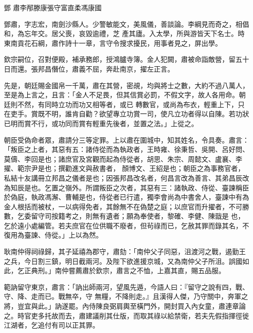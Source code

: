 
\begin{pinyinscope}

 鄧
 肅李邴滕康張守富直柔馮康國



 鄧肅，字志宏，南劍沙縣人。少警敏能文，美風儀，善談論。李綱見而奇之，相倡和，為忘年交。居父喪，哀毀逾禮，芝
 產其廬。入太學，所與游皆天下名士。時東南貢花石綱，肅作詩十一章，言守令搜求擾民，用事者見之，屏出學。



 欽宗嗣位，召對便殿，補承務郎，授鴻臚寺簿。金人犯闕，肅被命詣敵營，留五十日而還。張邦昌僭位，肅義不屈，奔赴南京，擢左正言。



 先是，朝廷賜金國帛一千萬，肅在其營，密覘，均與將士之數，大約不過八萬人，至是為上言之，且言：「金人不足畏，但其信賞必罰，不假文字，故人各用命。朝廷則不然，有同時立功而功又相等者，或已
 轉數官，或尚為布衣，輕重上下，只在吏手。賞既不明，誰肯自勸？欲望專立功賞一司，使凡立功者得以自陳。若功狀已明而賞不行，或功同而賞有輕重先後者，並置之法。」上從之。



 朝臣受偽命者眾，肅請分三等定罪。上以肅在圍城中，知其姓名，令具奏。肅言：「叛臣之上者，其惡有五：諸侍從而為執政者，王時雍、徐秉哲、吳開、呂好問、莫儔、李回是也；諸庶官及宮觀而起為侍從者，胡思、朱宗、周懿文、盧襄、李擢、範宗尹是也；撰勸進文與赦書者，
 顏博文、王紹是也；朝臣之為事務官者，私結十友講冊立邦昌之儀者是也；因張邦昌改名者，何昌言改為善言、其弟昌辰改為知辰是也。乞置之嶺外。所謂叛臣之次者，其惡有三：諸執政、侍從、臺諫稱臣於偽庭，執政馮澥、曹輔是也，侍從者已行遣，獨李會尚為中書舍人，臺諫中有為金人根括而被杖，一以病得免者，其餘無不在偽楚之庭；以庶官而升擢者，不可勝數，乞委留守司按籍考之，則無有遺者；願為奉使者，黎確、李健、陳戩是
 也，乞於遠小處編管。若夫庶官在位供職不廢者，但茍祿而已，乞赦其罪而錄其名，不復用為臺諫、侍從。」上以為然。



 耿南仲得祠祿歸，其子延禧為郡守，肅劾：「南仲父子同惡，沮渡河之戰，遏勤王之兵，今日割三鎮，明日截兩河。及陛下欲進援京城，又為南仲父子所沮。誤國如此，乞正典刑。」南仲嘗薦肅於欽宗，肅言之不恤，上嘉其直，賜五品服。



 範訥留守東京，肅言：「訥出師兩河，望風先遁，今語人曰：『留守之說有四，戰、守、降、走而已。戰無卒，守
 無糧，不降則走。』且漢得人傑，乃守關中，奔軍之將，豈宜與此。」訥遂罷。內侍陳良弼肩輿至橫門外，開封買入內女童，肅連章論之。時官吏多托故而去，肅建議削其仕版，而取其祿以給禁衛，若夫先假指揮徑徙江湖者，乞追付有司以正其罪。




\end{pinyinscope}
